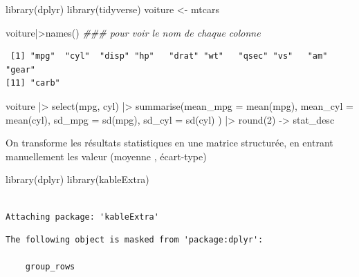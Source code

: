 \documentclass{article}
\newenvironment{Shaded}{\begin{snugshade}}{\end{snugshade}}
\newcommand{\AttributeTok}[1]{\textcolor[rgb]{0.40,0.45,0.13}{#1}}
\newcommand{\DecValTok}[1]{\textcolor[rgb]{0.68,0.00,0.00}{#1}}
\newcommand{\DocumentationTok}[1]{\textcolor[rgb]{0.37,0.37,0.37}{\textit{#1}}}
\newcommand{\FunctionTok}[1]{\textcolor[rgb]{0.28,0.35,0.67}{#1}}
\newcommand{\NormalTok}[1]{\textcolor[rgb]{0.00,0.23,0.31}{#1}}
\newcommand{\OtherTok}[1]{\textcolor[rgb]{0.00,0.23,0.31}{#1}}
\newcommand{\SpecialCharTok}[1]{\textcolor[rgb]{0.37,0.37,0.37}{#1}}
\begin{document}
\begin{Shaded}
\begin{Highlighting}[]
\FunctionTok{library}\NormalTok{(dplyr)}
\FunctionTok{library}\NormalTok{(tidyverse)}
\NormalTok{voiture }\OtherTok{\textless{}{-}}\NormalTok{ mtcars}

\NormalTok{voiture}\SpecialCharTok{|\textgreater{}}\FunctionTok{names}\NormalTok{() }\DocumentationTok{\#\#\# pour voir le nom de chaque colonne}
\end{Highlighting}
\end{Shaded}

\begin{verbatim}
 [1] "mpg"  "cyl"  "disp" "hp"   "drat" "wt"   "qsec" "vs"   "am"   "gear"
[11] "carb"
\end{verbatim}

\begin{Shaded}
\begin{Highlighting}[]
\NormalTok{voiture }\SpecialCharTok{|\textgreater{}} \FunctionTok{select}\NormalTok{(mpg, cyl) }\SpecialCharTok{|\textgreater{}} \FunctionTok{summarise}\NormalTok{(}\AttributeTok{mean\_mpg =} \FunctionTok{mean}\NormalTok{(mpg),}
         \AttributeTok{mean\_cyl =} \FunctionTok{mean}\NormalTok{(cyl), }\AttributeTok{sd\_mpg =} \FunctionTok{sd}\NormalTok{(mpg), }
         \AttributeTok{sd\_cyl =} \FunctionTok{sd}\NormalTok{(cyl) ) }\SpecialCharTok{|\textgreater{}} \FunctionTok{round}\NormalTok{(}\DecValTok{2}\NormalTok{) }\OtherTok{{-}\textgreater{}}\NormalTok{ stat\_desc}
\end{Highlighting}
\end{Shaded}

On transforme les résultats statistiques en une matrice structurée, en
entrant manuellement les valeur (moyenne , écart-type)

\begin{Shaded}
\begin{Highlighting}[]
\FunctionTok{library}\NormalTok{(dplyr)}
\FunctionTok{library}\NormalTok{(kableExtra)}
\end{Highlighting}
\end{Shaded}

\begin{verbatim}

Attaching package: 'kableExtra'
\end{verbatim}

\begin{verbatim}
The following object is masked from 'package:dplyr':

    group_rows
\end{verbatim}
\end{document}
